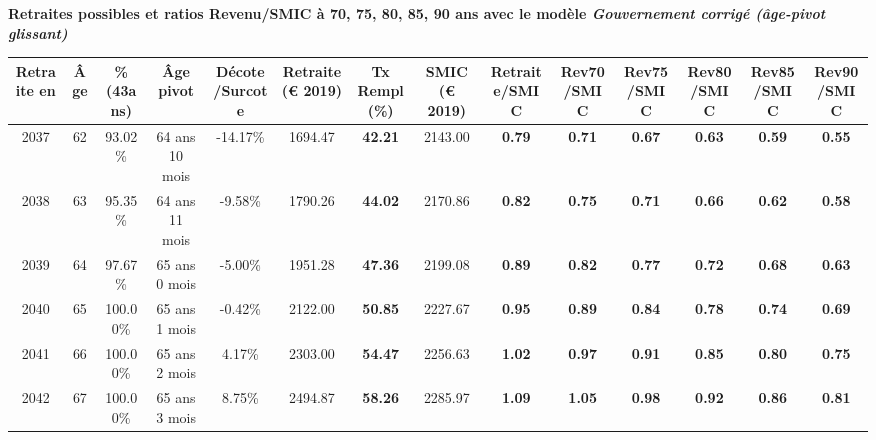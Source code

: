  \vspace{0.1cm} 
{\bf \noindent Retraites possibles et ratios Revenu/SMIC à 70, 75, 80, 85, 90 ans avec le modèle \emph{Gouvernement corrigé (âge-pivot glissant)}}  
 
\begin{adjustbox}{max width=\textwidth} 
\begin{tabular}[htb]{|c|c||c|c|c||c|c||c||c|c|c|c|c|c|} 
\hline 
 Retraite en &  Âge &  \%(43ans) &  Âge pivot &  Décote/Surcote &  Retraite (\euro{} 2019) &  Tx Rempl(\%) &  SMIC (\euro{} 2019) &  Retraite/SMIC &  Rev70/SMIC &  Rev75/SMIC &  Rev80/SMIC &  Rev85/SMIC &  Rev90/SMIC \\ 
\hline \hline 
 2037 &  62 &  93.02\% &  64 ans 10 mois &  -14.17\% &  1694.47 &  {\bf 42.21} &  2143.00 &  {\bf {\color{red} 0.79}} &  {\bf {\color{red} 0.71}} &  {\bf {\color{red} 0.67}} &  {\bf {\color{red} 0.63}} &  {\bf {\color{red} 0.59}} &  {\bf {\color{red} 0.55}} \\ 
\hline 
 2038 &  63 &  95.35\% &  64 ans 11 mois &  -9.58\% &  1790.26 &  {\bf 44.02} &  2170.86 &  {\bf {\color{red} 0.82}} &  {\bf {\color{red} 0.75}} &  {\bf {\color{red} 0.71}} &  {\bf {\color{red} 0.66}} &  {\bf {\color{red} 0.62}} &  {\bf {\color{red} 0.58}} \\ 
\hline 
 2039 &  64 &  97.67\% &  65 ans 0 mois &  -5.00\% &  1951.28 &  {\bf 47.36} &  2199.08 &  {\bf {\color{red} 0.89}} &  {\bf {\color{red} 0.82}} &  {\bf {\color{red} 0.77}} &  {\bf {\color{red} 0.72}} &  {\bf {\color{red} 0.68}} &  {\bf {\color{red} 0.63}} \\ 
\hline 
 2040 &  65 &  100.00\% &  65 ans 1 mois &  -0.42\% &  2122.00 &  {\bf 50.85} &  2227.67 &  {\bf {\color{red} 0.95}} &  {\bf {\color{red} 0.89}} &  {\bf {\color{red} 0.84}} &  {\bf {\color{red} 0.78}} &  {\bf {\color{red} 0.74}} &  {\bf {\color{red} 0.69}} \\ 
\hline 
 2041 &  66 &  100.00\% &  65 ans 2 mois &  4.17\% &  2303.00 &  {\bf 54.47} &  2256.63 &  {\bf 1.02} &  {\bf {\color{red} 0.97}} &  {\bf {\color{red} 0.91}} &  {\bf {\color{red} 0.85}} &  {\bf {\color{red} 0.80}} &  {\bf {\color{red} 0.75}} \\ 
\hline 
 2042 &  67 &  100.00\% &  65 ans 3 mois &  8.75\% &  2494.87 &  {\bf 58.26} &  2285.97 &  {\bf 1.09} &  {\bf 1.05} &  {\bf {\color{red} 0.98}} &  {\bf {\color{red} 0.92}} &  {\bf {\color{red} 0.86}} &  {\bf {\color{red} 0.81}} \\ 
\hline 
\hline 
\end{tabular} 
\end{adjustbox} 
 
